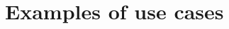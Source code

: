 \documentclass[letterpaper, 10 pt]{IEEEconf}
\begin{document}

\section{Examples of use cases}


\addtolength{\textheight}{-12cm}   %



\end{document}

